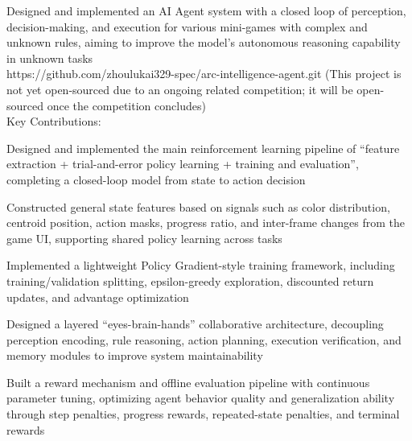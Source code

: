 \documentclass{resume}
\begin{document}
Designed and implemented an AI Agent system with a closed loop of perception, decision-making, and execution for various mini-games with complex and unknown rules, aiming to improve the model's autonomous reasoning capability in unknown tasks\\
https://github.com/zhoulukai329-spec/arc-intelligence-agent.git (This project is not yet open-sourced due to an ongoing related competition; it will be open-sourced once the competition concludes)\\
Key Contributions:
\begin{onehalfspacing}
\begin{projectitems}
  \item Designed and implemented the main reinforcement learning pipeline of ``feature extraction + trial-and-error policy learning + training and evaluation'', completing a closed-loop model from state to action decision
  \item Constructed general state features based on signals such as color distribution, centroid position, action masks, progress ratio, and inter-frame changes from the game UI, supporting shared policy learning across tasks
  \item Implemented a lightweight Policy Gradient-style training framework, including training/validation splitting, epsilon-greedy exploration, discounted return updates, and advantage optimization
  \item Designed a layered ``eyes-brain-hands'' collaborative architecture, decoupling perception encoding, rule reasoning, action planning, execution verification, and memory modules to improve system maintainability
  \item Built a reward mechanism and offline evaluation pipeline with continuous parameter tuning, optimizing agent behavior quality and generalization ability through step penalties, progress rewards, repeated-state penalties, and terminal rewards
\end{projectitems}
\end{onehalfspacing}
\projectdivider
\end{document}
